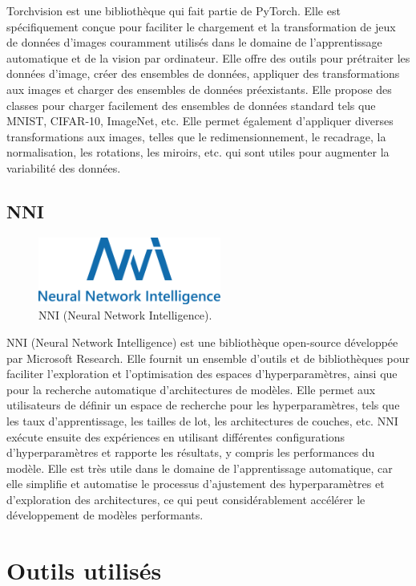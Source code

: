 Torchvision est une bibliothèque qui fait partie de PyTorch. Elle est spécifiquement conçue pour faciliter le chargement et la transformation de jeux de données d'images couramment utilisés dans le domaine de l'apprentissage automatique et de la vision par ordinateur. Elle offre des outils pour prétraiter les données d'image, créer des ensembles de données, appliquer des transformations aux images et charger des ensembles de données préexistants. Elle propose des classes pour charger facilement des ensembles de données standard tels que MNIST, CIFAR-10, ImageNet, etc. Elle permet également d'appliquer diverses transformations aux images, telles que le redimensionnement, le recadrage, la normalisation, les rotations, les miroirs, etc. qui sont utiles pour augmenter la variabilité des données.

\subsection{NNI}

\begin{figure}[hbt!]
  \centering
  \includegraphics[width=6cm]{images_pfe/nni.png}
  \caption{NNI (Neural Network Intelligence).}
  \label{fig:nni}
\end{figure}
\FloatBarrier
\medskip

NNI (Neural Network Intelligence) est une bibliothèque open-source développée par Microsoft Research. Elle fournit un ensemble d'outils et de bibliothèques pour faciliter l'exploration et l'optimisation des espaces d'hyperparamètres, ainsi que pour la recherche automatique d'architectures de modèles. Elle permet aux utilisateurs de définir un espace de recherche pour les hyperparamètres, tels que les taux d'apprentissage, les tailles de lot, les architectures de couches, etc. NNI exécute ensuite des expériences en utilisant différentes configurations d'hyperparamètres et rapporte les résultats, y compris les performances du modèle. Elle est très utile dans le domaine de l'apprentissage automatique, car elle simplifie et automatise le processus d'ajustement des hyperparamètres et d'exploration des architectures, ce qui peut considérablement accélérer le développement de modèles performants.

\section{Outils utilisés}

